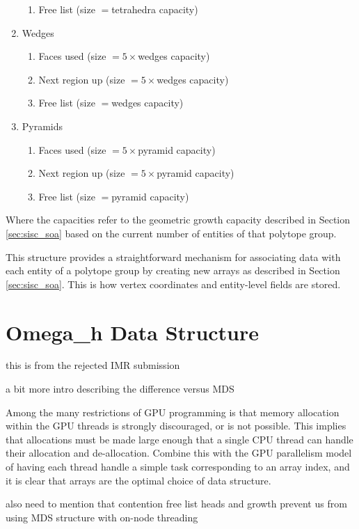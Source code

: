 \begin{enumerate}
\begin{enumerate}
  \item Free list (size $=$tetrahedra capacity)
  \end{enumerate}
\item Wedges
  \begin{enumerate}
  \item Faces used (size $=5\times$wedges capacity)
  \item Next region up (size $=5\times$wedges capacity)
  \item Free list (size $=$wedges capacity)
  \end{enumerate}
\item Pyramids
  \begin{enumerate}
  \item Faces used (size $=5\times$pyramid capacity)
  \item Next region up (size $=5\times$pyramid capacity)
  \item Free list (size $=$pyramid capacity)
  \end{enumerate}
\end{enumerate}
Where the capacities refer to the geometric growth
capacity described in Section \ref{sec:sisc_soa} based
on the current number of entities of that polytope group.

This structure provides a straightforward mechanism for associating
data with each entity of a polytope group by creating
new arrays as described in Section \ref{sec:sisc_soa}.
This is how vertex coordinates and entity-level fields
are stored.


\section{Omega\_h Data Structure}
\label{sec:omega_h-struct}

{\color{red} this is from the rejected IMR submission}

{\color{red} a bit more intro describing the difference
versus MDS}

Among the many restrictions of GPU programming
is that memory allocation within the GPU threads is strongly
discouraged, or is not possible.
This implies that allocations must be made large enough
that a single CPU thread can handle their allocation and de-allocation.
Combine this with the GPU parallelism model of having each
thread handle a simple task corresponding to an array index, and
it is clear that arrays are the optimal choice of data structure.

{\color{red} also need to mention that contention free list
heads and growth prevent us from using MDS structure
with on-node threading}

